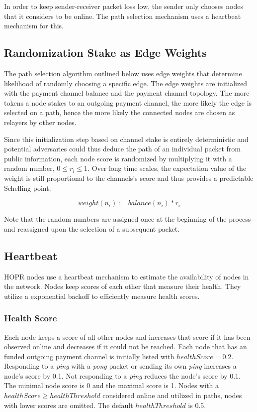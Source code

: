 In order to keep sender-receiver packet loss low, the sender only chooses nodes that it considers to be online. The path selection mechanism uses a heartbeat mechanism for this.



\subsection{Randomization Stake as Edge Weights}
The path selection algorithm outlined below uses edge weights that determine likelihood of randomly choosing a specific edge. The edge weights are initialized with the payment channel balance and the payment channel topology. The more tokens a node stakes to an outgoing payment channel, the more likely the edge is selected on a path, hence the more likely the connected nodes are chosen as relayers by other nodes.

Since this initialization step based on channel stake is entirely deterministic and potential adversaries could thus deduce the path of an individual packet from public information, each node score is randomized by multiplying it with a random number, $0 \le r_i \le 1$. Over long time scales, the expectation value of the weight is still proportional to the channels's score and thus provides a predictable Schelling point.

$$ weight(n_i) := balance(n_i) * r_i$$

Note that the random numbers are assigned once at the beginning of the process and reassigned upon the selection of a subsequent packet.


\subsection{Heartbeat}
HOPR nodes use a heartbeat mechanism to estimate the availability of nodes in the network. Nodes keep scores of each other that measure their health. They utilize a exponential backoff to efficiently measure health scores.

\subsubsection{Health Score}
Each node keeps a score of all other nodes and increases that score if it has been observed online and decreases if it could not be reached. Each node that has an funded outgoing payment channel is initially listed with $healthScore = 0.2$. Responding to a \textit{ping} with a \textit{pong} packet or sending its own \textit{ping} increases a node's score by 0.1. Not responding to a \textit{ping} reduces the node's score by 0.1. The minimal node score is 0 and the maximal score is 1. Nodes with a $healthScore \ge healthThreshold$ considered online and utilized in paths, nodes with lower scores are omitted. The default $healthThreshold$ is $0.5$.

